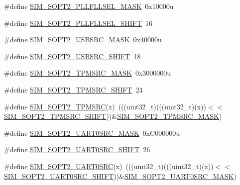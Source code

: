 \begin{DoxyCompactItemize}
\item 
\#define \hyperlink{group___s_i_m___register___masks_gaa14141a225f9778babacbf3b90d0bae2}{S\+I\+M\+\_\+\+S\+O\+P\+T2\+\_\+\+P\+L\+L\+F\+L\+L\+S\+E\+L\+\_\+\+M\+A\+SK}~0x10000u
\item 
\#define \hyperlink{group___s_i_m___register___masks_gae98b4d574b65472bdb294092d4ce5b4a}{S\+I\+M\+\_\+\+S\+O\+P\+T2\+\_\+\+P\+L\+L\+F\+L\+L\+S\+E\+L\+\_\+\+S\+H\+I\+FT}~16
\item 
\#define \hyperlink{group___s_i_m___register___masks_ga1caf7ffe2555eb59ed410110b6aba463}{S\+I\+M\+\_\+\+S\+O\+P\+T2\+\_\+\+U\+S\+B\+S\+R\+C\+\_\+\+M\+A\+SK}~0x40000u
\item 
\#define \hyperlink{group___s_i_m___register___masks_ga2a455b7e86f26185c92961e139d13a89}{S\+I\+M\+\_\+\+S\+O\+P\+T2\+\_\+\+U\+S\+B\+S\+R\+C\+\_\+\+S\+H\+I\+FT}~18
\item 
\#define \hyperlink{group___s_i_m___register___masks_gab515715932139549d30bb4b6f3e2dc99}{S\+I\+M\+\_\+\+S\+O\+P\+T2\+\_\+\+T\+P\+M\+S\+R\+C\+\_\+\+M\+A\+SK}~0x3000000u
\item 
\#define \hyperlink{group___s_i_m___register___masks_gac70dc9abda7a707019da3d8fed90a265}{S\+I\+M\+\_\+\+S\+O\+P\+T2\+\_\+\+T\+P\+M\+S\+R\+C\+\_\+\+S\+H\+I\+FT}~24
\item 
\#define \hyperlink{group___s_i_m___register___masks_gae3feae3d7da32c0a46d155fdfdf8d4da}{S\+I\+M\+\_\+\+S\+O\+P\+T2\+\_\+\+T\+P\+M\+S\+RC}(x)~(((uint32\+\_\+t)(((uint32\+\_\+t)(x))$<$$<$\hyperlink{group___s_i_m___register___masks_gac70dc9abda7a707019da3d8fed90a265}{S\+I\+M\+\_\+\+S\+O\+P\+T2\+\_\+\+T\+P\+M\+S\+R\+C\+\_\+\+S\+H\+I\+FT}))\&\hyperlink{group___s_i_m___register___masks_gab515715932139549d30bb4b6f3e2dc99}{S\+I\+M\+\_\+\+S\+O\+P\+T2\+\_\+\+T\+P\+M\+S\+R\+C\+\_\+\+M\+A\+SK})
\item 
\#define \hyperlink{group___s_i_m___register___masks_ga9527f6a7148fe172b12a87e0b3b92492}{S\+I\+M\+\_\+\+S\+O\+P\+T2\+\_\+\+U\+A\+R\+T0\+S\+R\+C\+\_\+\+M\+A\+SK}~0x\+C000000u
\item 
\#define \hyperlink{group___s_i_m___register___masks_ga0790a9307dcaad17166308eb2f1b62df}{S\+I\+M\+\_\+\+S\+O\+P\+T2\+\_\+\+U\+A\+R\+T0\+S\+R\+C\+\_\+\+S\+H\+I\+FT}~26
\item 
\#define \hyperlink{group___s_i_m___register___masks_ga37a051e2761f563083fe3c82234f04ca}{S\+I\+M\+\_\+\+S\+O\+P\+T2\+\_\+\+U\+A\+R\+T0\+S\+RC}(x)~(((uint32\+\_\+t)(((uint32\+\_\+t)(x))$<$$<$\hyperlink{group___s_i_m___register___masks_ga0790a9307dcaad17166308eb2f1b62df}{S\+I\+M\+\_\+\+S\+O\+P\+T2\+\_\+\+U\+A\+R\+T0\+S\+R\+C\+\_\+\+S\+H\+I\+FT}))\&\hyperlink{group___s_i_m___register___masks_ga9527f6a7148fe172b12a87e0b3b92492}{S\+I\+M\+\_\+\+S\+O\+P\+T2\+\_\+\+U\+A\+R\+T0\+S\+R\+C\+\_\+\+M\+A\+SK})

\end{DoxyCompactItemize}
